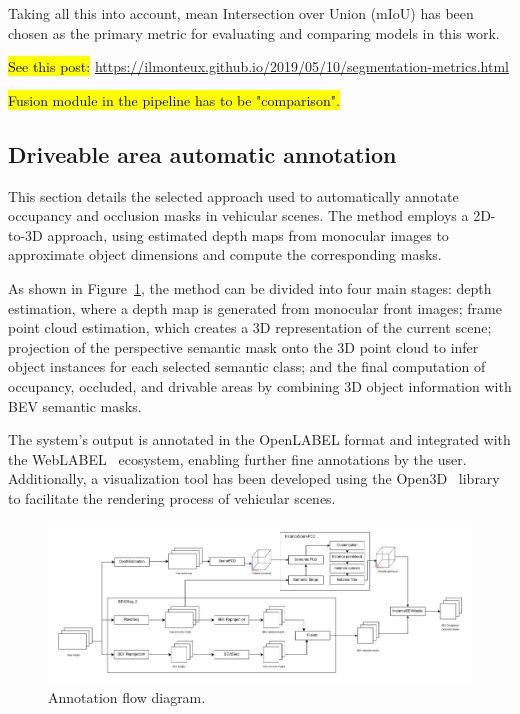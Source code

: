 Taking all this into account, mean Intersection over Union (mIoU) has been chosen as the primary metric for evaluating and comparing models in this work.

\hl{See this post: } \url{https://ilmonteux.github.io/2019/05/10/segmentation-metrics.html}

\hl{Fusion module in the pipeline has to be "comparison".}

\subsection{Driveable area automatic annotation}
\label{sec:aplication}

This section details the selected approach used to automatically annotate occupancy and occlusion masks in vehicular scenes. The method employs a 2D-to-3D approach, using estimated depth maps from monocular images to approximate object dimensions and compute the corresponding masks.

As shown in Figure~\ref{fig:application_flow_diagram}, the method can be divided into four main stages: depth estimation, where a depth map is generated from monocular front images; frame point cloud estimation, which creates a 3D representation of the current scene; projection of the perspective semantic mask onto the 3D point cloud to infer object instances for each selected semantic class; and the final computation of occupancy, occluded, and drivable areas by combining 3D object information with BEV semantic masks.

The system's output is annotated in the OpenLABEL format and integrated with the WebLABEL~\cite{weblabel} ecosystem, enabling further fine annotations by the user. Additionally, a visualization tool has been developed using the Open3D~\cite{open3d} library to facilitate the rendering process of vehicular scenes.

\begin{figure}[h!]
    \centering
    \includegraphics[width=\linewidth]{images/methodology/Application_flow_diagram.png}
    \caption{Annotation flow diagram.}
    \label{fig:application_flow_diagram}
\end{figure}

